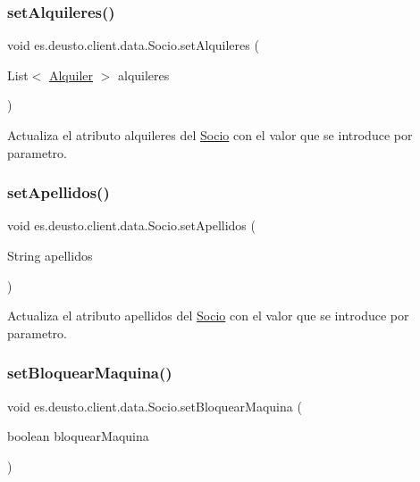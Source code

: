 \subsubsection{\texorpdfstring{setAlquileres()}{setAlquileres()}}
{\footnotesize\ttfamily void es.\+deusto.\+client.\+data.\+Socio.\+set\+Alquileres (\begin{DoxyParamCaption}\item[{List$<$ \mbox{\hyperlink{classes_1_1deusto_1_1client_1_1data_1_1_alquiler}{Alquiler}} $>$}]{alquileres }\end{DoxyParamCaption})}

Actualiza el atributo alquileres del \mbox{\hyperlink{classes_1_1deusto_1_1client_1_1data_1_1_socio}{Socio}} con el valor que se introduce por parametro. \mbox{\label{classes_1_1deusto_1_1client_1_1data_1_1_socio_afff71fd05a69817bc4ca7b672f7bff52}} 
\subsubsection{\texorpdfstring{setApellidos()}{setApellidos()}}
{\footnotesize\ttfamily void es.\+deusto.\+client.\+data.\+Socio.\+set\+Apellidos (\begin{DoxyParamCaption}\item[{String}]{apellidos }\end{DoxyParamCaption})}

Actualiza el atributo apellidos del \mbox{\hyperlink{classes_1_1deusto_1_1client_1_1data_1_1_socio}{Socio}} con el valor que se introduce por parametro. \mbox{\label{classes_1_1deusto_1_1client_1_1data_1_1_socio_a413141651c6e0e8abf2238413387db7e}} 
\subsubsection{\texorpdfstring{setBloquearMaquina()}{setBloquearMaquina()}}
{\footnotesize\ttfamily void es.\+deusto.\+client.\+data.\+Socio.\+set\+Bloquear\+Maquina (\begin{DoxyParamCaption}\item[{boolean}]{bloquear\+Maquina }\end{DoxyParamCaption})}

